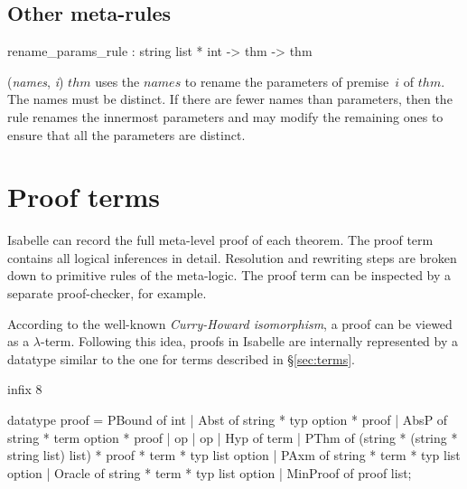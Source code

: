 \subsection{Other meta-rules}
\begin{ttbox} 
rename_params_rule : string list * int -> thm -> thm
\end{ttbox}
\begin{ttdescription}

\item[\ttindexbold{rename_params_rule} ({\it names}, {\it i}) $thm$] 
uses the $names$ to rename the parameters of premise~$i$ of $thm$.  The
names must be distinct.  If there are fewer names than parameters, then the
rule renames the innermost parameters and may modify the remaining ones to
ensure that all the parameters are distinct.

\end{ttdescription}


\section{Proof terms}\label{sec:proofObjects}
 Isabelle can record the full meta-level proof of each
theorem.  The proof term contains all logical inferences in detail.
Resolution and rewriting steps are broken down to primitive rules of the
meta-logic. The proof term can be inspected by a separate proof-checker,
for example.

According to the well-known {\em Curry-Howard isomorphism}, a proof can
be viewed as a $\lambda$-term. Following this idea, proofs
in Isabelle are internally represented by a datatype similar to the one for
terms described in \S\ref{sec:terms}.
\begin{ttbox}
infix 8 %

datatype proof =
   PBound of int
 | Abst of string * typ option * proof
 | AbsP of string * term option * proof
 | op %
 | op %
 | Hyp of term
 | PThm of (string * (string * string list) list) *
           proof * term * typ list option
 | PAxm of string * term * typ list option
 | Oracle of string * term * typ list option
 | MinProof of proof list;
\end{ttbox}

